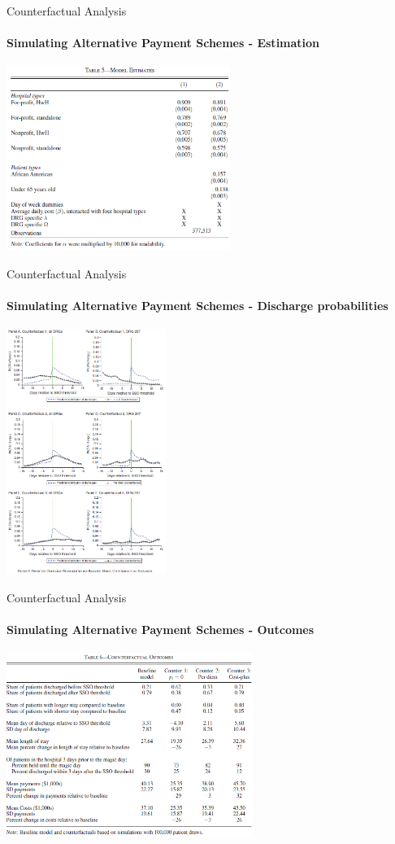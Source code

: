\documentclass{beamer}
\begin{document}
\begin{frame}{Counterfactual Analysis}
\framesubtitle{Simulating Alternative Payment Schemes - Estimation}
\begin{center}
\includegraphics[height=6cm]{dyn_est}
\end{center}
\end{frame}

\begin{frame}{Counterfactual Analysis}
\framesubtitle{Simulating Alternative Payment Schemes - Discharge probabilities}
\begin{center}
\includegraphics[height=8cm]{counter_discharge_prob}
\end{center}
\end{frame}

\begin{frame}{Counterfactual Analysis}
\framesubtitle{Simulating Alternative Payment Schemes - Outcomes}
\begin{center}
\includegraphics[height=6cm]{counter_outcome}
\end{center}
\end{frame}
\end{document}
